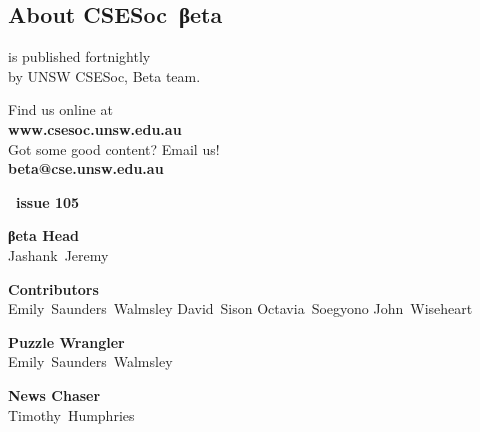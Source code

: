 \documentclass[twoside]{article}
\date{13 April 2015}
\makeatletter
\gdef\the@year{2015}
\gdef\the@issue{105}
\makeatother
\begin{document}

\newpage
\maketitle\thispagestyle{mag}
\begin{multicols}{2}\begingroup
\section*{About CSE{}Soc~βeta}\begin{center}
\csesocbeta{} is published fortnightly\\
by UNSW CSESoc, Beta team.
\par Find us online at\\
\textbf{www.csesoc.unsw.edu.au}\\
Got some good content? Email us!\\
\textbf{beta@cse.unsw.edu.au}\\
\vspace{1em}\par
{\Large\bf\makeatletter \the@year\ issue \the@issue}
\par{\bf\sffamily βeta Head}\\ Jashank~Jeremy
\par{\bf\sffamily Contributors}\\
  Emily~Saunders~Walmsley\hsp{}
  David~Sison\hsp{}
  Octavia~Soegyono\hsp{}
  John~Wiseheart\hsp{}
\par{\bf\sffamily Puzzle Wrangler}\\ Emily~Saunders~Walmsley
\par{\bf\sffamily News Chaser}\\ Timothy~Humphries
\end{center}

\vfill\malcontents\raggedcolumns\columnbreak
\endgroup\raggedcolumns


\end{multicols}
\end{document}
